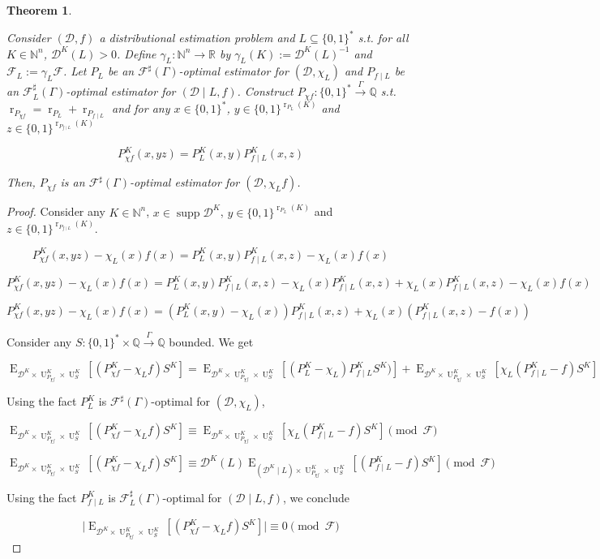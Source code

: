 \documentclass{article}
\numberwithin{equation}{section}
\theoremstyle{definition}
\theoremstyle{plain}
\newtheorem{theorem}{Theorem}[section]
\newcommand{\Bool}{\{0,1\}}
\newcommand{\Words}{{\Bool^*}}
\DeclareMathOperator{\Supp}{supp}
\DeclareMathOperator{\E}{E}
\DeclareMathOperator{\R}{r}
\DeclareMathOperator{\Un}{U}
\newcommand{\Nats}{\mathbb{N}}
\newcommand{\Rats}{\mathbb{Q}}
\newcommand{\Reals}{\mathbb{R}}
\newcommand{\NatFun}{\Nats^n \rightarrow}
\newcommand{\Abs}[1]{\lvert #1 \rvert}
\newcommand{\Dist}{\mathcal{D}}
\newcommand{\Fall}{\mathcal{F}}
\newcommand{\ESG}{\Fall^\sharp(\Gamma)}
\newcommand{\BoolR}[1]{\Bool^{\R_{#1}(K)}}
\newcommand{\Scheme}{\xrightarrow{\Gamma}}
\begin{document}
\begin{samepage}
\begin{theorem}
\label{thm:con_cond}

Consider $(\Dist, f)$ a distributional estimation problem and ${L \subseteq \Words}$ s.t. for all $K \in \Nats^n$, $\Dist^K(L) > 0$. Define $\gamma_L: \NatFun \Reals$ by $\gamma_L(K):=\Dist^{K}(L)^{-1}$ and $\Fall_L:=\gamma_L \Fall$. Let $P_L$ be an $\ESG$-optimal estimator for $(\Dist, \chi_L)$ and $P_{f \mid L}$ be an $\Fall_L^\sharp(\Gamma)$-optimal estimator for ${(\Dist \mid L, f)}$. Construct ${P_{\chi f}: \Words \Scheme \Rats}$ s.t. $\R_{P_{\chi f}}=\R_{P_L} + \R_{P_{f \mid L}}$ and for any ${x \in \Words}$, $y \in \BoolR{P_L}$ and ${z \in \BoolR{P_{f \mid L}}}$

\begin{equation}
P_{\chi f}^K(x,yz)=P_L^K(x,y) P_{f \mid L}^K(x,z)
\end{equation}

Then, $P_{\chi f}$ is an $\ESG$-optimal estimator for $(\Dist, \chi_L f)$.

\end{theorem}
\end{samepage}

\begin{proof}

Consider any $K \in \Nats^n$, $x \in \Supp \Dist^{K}$, $y \in \BoolR{P_L}$ and $z \in \BoolR{P_{f \mid L}}$.

\[P_{\chi f}^K(x,yz) - \chi_L(x) f(x) = P_L^K(x,y) P_{f \mid L}^K(x,z) - \chi_L(x) f(x)\]

\[P_{\chi f}^K(x,yz) - \chi_L(x) f(x) = P_L^K(x,y) P_{f \mid L}^K(x,z) - \chi_L(x) P_{f \mid L}^K(x,z) + \chi_L(x) P_{f \mid L}^K(x,z) - \chi_L(x) f(x)\]

\[P_{\chi f}^K(x,yz) - \chi_L(x) f(x) = (P_L^K(x,y) - \chi_L(x)) P_{f \mid L}^K(x,z) + \chi_L(x) (P_{f \mid L}^K(x,z) - f(x))\]

Consider any $S: \Words \times \Rats \Scheme \Rats$ bounded. We get

\[\E_{\Dist^{K} \times \Un_{P_{\chi f}}^K \times \Un_S^K}[(P_{\chi f}^K - \chi_L f)S^K] = \E_{\Dist^{K} \times \Un_{P_{\chi f}}^K \times \Un_S^K}[(P_L^K - \chi_L) P_{f \mid L}^KS^K)] + \E_{\Dist^{K} \times \Un_{P_{\chi f}}^K \times \Un_S^K}[\chi_L (P_{f \mid L}^K - f)S^K]\]

Using the fact $P_L^K$ is $\ESG$-optimal for $(\Dist,\chi_L)$,

\[\E_{\Dist^{K} \times \Un_{P_{\chi f}}^K \times \Un_S^K}[(P_{\chi f}^K - \chi_L f)S^K] \equiv  \E_{\Dist^{K} \times \Un_{P_{\chi f}}^K \times \Un_S^K}[\chi_L (P_{f \mid L}^K - f)S^K] \pmod \Fall\]

\[\E_{\Dist^{K} \times \Un_{P_{\chi f}}^K \times \Un_S^K}[(P_{\chi f}^K - \chi_L f)S^K] \equiv \Dist^{K}(L)  \E_{(\Dist^{K} \mid L) \times \Un_{P_{\chi f}}^K \times \Un_S^K}[(P_{f \mid L}^K - f)S^K] \pmod \Fall\]
 
Using the fact $P_{f \mid L}^K$ is $\Fall_L^\sharp(\Gamma)$-optimal for $(\Dist \mid L, f)$, we conclude
 
 \[\Abs{\E_{\Dist^{K} \times \Un_{P_{\chi f}}^K \times \Un_S^K}[(P_{\chi f}^K - \chi_L f)S^K]} \equiv 0 \pmod \Fall\]
%
\end{proof}
 
\end{document}
